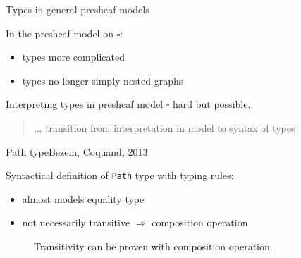 \documentclass[english,draft]{beamer}
\newcommand{\pa}[3]{\texttt{Path}_{#1}\left(#2, #3\right)}
\begin{document}
\begin{frame}{Types in general presheaf models}

In the presheaf model on $\square$:
\begin{itemize}
    \item types more complicated
    \item types no longer simply nested graphs
\end{itemize}



Interpreting types in presheaf model $\square$ hard but possible.


\begin{quotation}
 ... transition from interpretation in model to syntax of types
\end{quotation}


\end{frame}

\begin{frame}{Path type}{Bezem, Coquand, 2013}
 
 Syntactical definition of \texttt{Path} type with typing rules:

\begin{prooftree}

\end{prooftree}

% 

\begin{itemize}
 \item almost models equality type
 \item not necessarily transitive $\Rightarrow$ composition operation
\end{itemize}


\begin{figure}
\centering

\caption{Transitivity can be proven with composition operation.}
\end{figure}

\end{frame}
\end{document}
